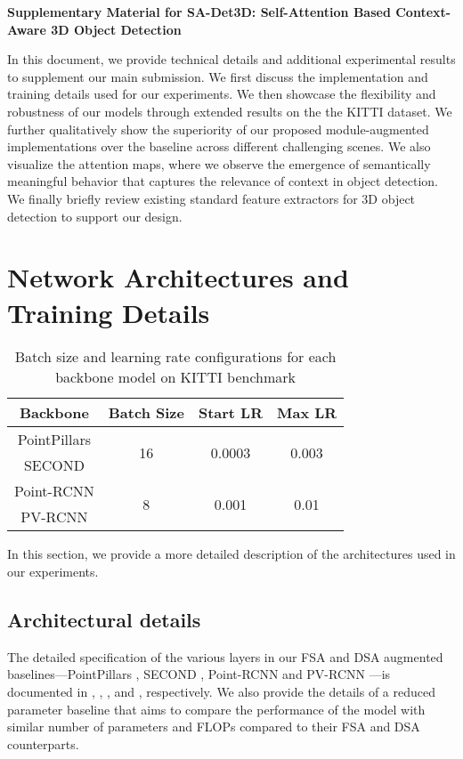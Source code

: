 \documentclass[10pt,twocolumn,letterpaper]{article}
\begin{document}
\clearpage
\begin{center}
\textbf{\large Supplementary Material for SA-Det3D: Self-Attention Based Context-Aware 3D Object Detection}
\end{center}
\renewcommand{\theequation}{\arabic{equation}}
\renewcommand{\thefigure}{\arabic{figure}}
In this document, we provide technical details and additional experimental results to supplement our main submission. We first discuss the implementation and training details used for our experiments. We then showcase the flexibility and robustness of our models through extended results on the the KITTI \cite{KITTI} dataset. We further qualitatively show the superiority of our proposed module-augmented implementations over the baseline across different challenging scenes. We also visualize the attention maps, where we observe the emergence of semantically meaningful behavior that captures the relevance of context in object detection. We finally briefly review existing standard feature extractors for 3D object detection to support our design.

\section{Network Architectures and Training Details}
\setlength{\tabcolsep}{5pt}
\begin{table}[b]
    \centering
    \begin{tabular}{c||c|c|c}
        \hline
        Backbone & Batch Size & Start LR & Max LR \\
        \hline
        PointPillars & \multirow{2}{*}{16} &
        \multirow{2}{*}{0.0003} & \multirow{2}{*}{0.003} \\
        \cline{1-1}
        SECOND & & & \\
        \hline
        Point-RCNN & \multirow{2}{*}{8} &
        \multirow{2}{*}{0.001} & \multirow{2}{*}{0.01} \\
        \cline{1-1}
        PV-RCNN & & & \\
        \hline
    \end{tabular}
    \caption{Batch size and learning rate configurations for each backbone model on KITTI benchmark}
    \label{tab:train_config}
\end{table} In this section, we provide a more detailed description of the architectures used in our experiments. 

\subsection{Architectural details}
The detailed specification of the various layers in our FSA and DSA augmented baselines---PointPillars \cite{pointpillars}, SECOND \cite{SECOND}, Point-RCNN \cite{PointRCNN} and PV-RCNN \cite{PVRCNN}---is documented in , , , and , respectively. We also provide the details of a reduced parameter baseline that aims to compare the performance of the model with similar number of parameters and FLOPs compared to their FSA and DSA counterparts.
\end{document}
